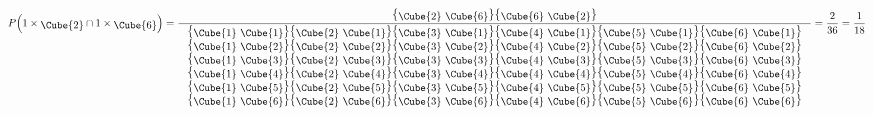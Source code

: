 \begin{equation}
  P\!\left(1\times{\mbox{\raisebox{-2pt}{\Cube{2}}}} \cap
  1\times\mbox{\raisebox{-2pt}{\Cube{6}}}\right) =
  \frac{
    \mbox{
      \big\{\raisebox{-2pt}{\Cube{2} \Cube{6}}\big\}\big\{\raisebox{-2pt}{\Cube{6} \Cube{2}}\big\}
    }
  }{
    \begin{array}{c}
      \mbox{
        \big\{\raisebox{-2pt}{\Cube{1} \Cube{1}}\big\}\big\{\raisebox{-2pt}{\Cube{2} \Cube{1}}\big\}\big\{\raisebox{-2pt}{\Cube{3} \Cube{1}}\big\}\big\{\raisebox{-2pt}{\Cube{4} \Cube{1}}\big\}\big\{\raisebox{-2pt}{\Cube{5} \Cube{1}}\big\}\big\{\raisebox{-2pt}{\Cube{6} \Cube{1}}\big\}
      }\\
      \mbox{
        \big\{\raisebox{-2pt}{\Cube{1} \Cube{2}}\big\}\big\{\raisebox{-2pt}{\Cube{2} \Cube{2}}\big\}\big\{\raisebox{-2pt}{\Cube{3} \Cube{2}}\big\}\big\{\raisebox{-2pt}{\Cube{4} \Cube{2}}\big\}\big\{\raisebox{-2pt}{\Cube{5} \Cube{2}}\big\}\big\{\raisebox{-2pt}{\Cube{6} \Cube{2}}\big\}
      }\\
      \mbox{
        \big\{\raisebox{-2pt}{\Cube{1} \Cube{3}}\big\}\big\{\raisebox{-2pt}{\Cube{2} \Cube{3}}\big\}\big\{\raisebox{-2pt}{\Cube{3} \Cube{3}}\big\}\big\{\raisebox{-2pt}{\Cube{4} \Cube{3}}\big\}\big\{\raisebox{-2pt}{\Cube{5} \Cube{3}}\big\}\big\{\raisebox{-2pt}{\Cube{6} \Cube{3}}\big\}
      }\\
      \mbox{
        \big\{\raisebox{-2pt}{\Cube{1} \Cube{4}}\big\}\big\{\raisebox{-2pt}{\Cube{2} \Cube{4}}\big\}\big\{\raisebox{-2pt}{\Cube{3} \Cube{4}}\big\}\big\{\raisebox{-2pt}{\Cube{4} \Cube{4}}\big\}\big\{\raisebox{-2pt}{\Cube{5} \Cube{4}}\big\}\big\{\raisebox{-2pt}{\Cube{6} \Cube{4}}\big\}
      }\\
      \mbox{
        \big\{\raisebox{-2pt}{\Cube{1} \Cube{5}}\big\}\big\{\raisebox{-2pt}{\Cube{2} \Cube{5}}\big\}\big\{\raisebox{-2pt}{\Cube{3} \Cube{5}}\big\}\big\{\raisebox{-2pt}{\Cube{4} \Cube{5}}\big\}\big\{\raisebox{-2pt}{\Cube{5} \Cube{5}}\big\}\big\{\raisebox{-2pt}{\Cube{6} \Cube{5}}\big\}
      }\\
      \mbox{
        \big\{\raisebox{-2pt}{\Cube{1} \Cube{6}}\big\}\big\{\raisebox{-2pt}{\Cube{2} \Cube{6}}\big\}\big\{\raisebox{-2pt}{\Cube{3} \Cube{6}}\big\}\big\{\raisebox{-2pt}{\Cube{4} \Cube{6}}\big\}\big\{\raisebox{-2pt}{\Cube{5} \Cube{6}}\big\}\big\{\raisebox{-2pt}{\Cube{6} \Cube{6}}\big\}
      }
    \end{array}
  } = \frac{2}{36} = \frac{1}{18}
  \label{eq:1116}
\end{equation}

